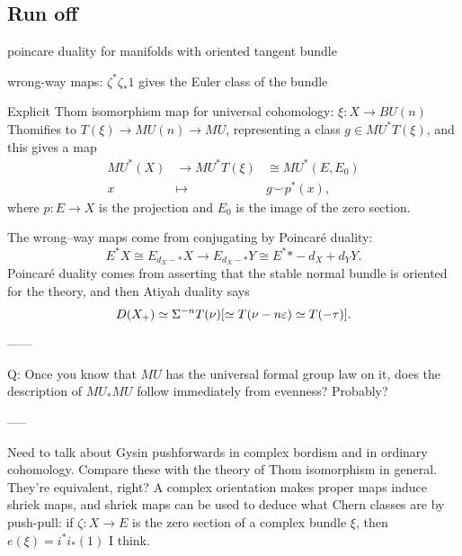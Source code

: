 \subsection*{Run off}









poincare duality for manifolds with oriented tangent bundle

wrong-way maps: $\zeta^* \zeta_* 1$ gives the Euler class of the bundle

Explicit Thom isomorphism map for universal cohomology: $\xi: X \to BU(n)$ Thomifies to $T(\xi) \to MU(n) \to MU$, representing a class $g \in MU^* T(\xi)$, and this gives a map
\begin{align*}
MU^*(X) & \to MU^* T(\xi) & \cong MU^*(E, E_0)\\
x & \mapsto & g \smile p^*(x),
\end{align*}
where $p: E \to X$ is the projection and $E_0$ is the image of the zero section.

The wrong--way maps come from conjugating by Poincar\'e duality: \[E^* X \cong E_{d_X-*} X \to E_{d_X-*} Y \cong E^*{*-d_X+d_Y} Y.\]  Poincar\'e duality comes from asserting that the stable normal bundle is oriented for the theory, and then Atiyah duality says \[D(X_+) \simeq \Sigma^{-n} T(\nu) [\simeq T(\nu - n\varepsilon) \simeq T(-\tau)]. \]

------

Q: Once you know that $MU$ has the universal formal group law on it, does the description of $MU_* MU$ follow immediately from evenness?  Probably?

-----

Need to talk about Gysin pushforwards in complex bordism and in ordinary cohomology.  Compare these with the theory of Thom isomorphism in general.  They're equivalent, right?  A complex orientation makes proper maps induce shriek maps, and shriek maps can be used to deduce what Chern classes are by push-pull: if $\zeta: X \to E$ is the zero section of a complex bundle $\xi$, then $e(\xi) = i^* i_*(1)$ I think.


